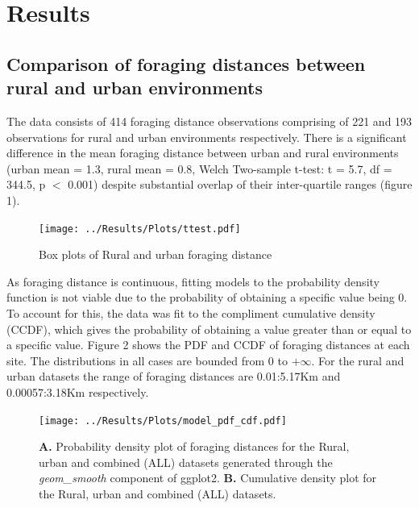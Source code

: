 \documentclass[11pt]{article}
\begin{document}
\section{Results}
\begin{linenumbers}

\subsection{Comparison of foraging distances between rural and urban environments}
The data consists of 414 foraging distance observations comprising of 221 and 193 observations for rural and urban environments respectively. There is a significant difference in the mean foraging distance between urban and rural environments (urban mean = 1.3, rural mean = 0.8, Welch Two-sample t-test: t = 5.7, df = 344.5, p $<$ 0.001) despite substantial overlap of their inter-quartile ranges (figure 1).\\ \par

\begin{figure}[H]
	\centering
	\texttt{[image: ../Results/Plots/ttest.pdf]}
	\caption{Box plots of Rural and urban foraging distance}
\end{figure}
	
As foraging distance is continuous, fitting models to the probability density function is not viable due to the probability of obtaining a specific value being 0. To account for this, the data was fit to the compliment cumulative density (CCDF), which gives the probability of obtaining a value greater than or equal to a specific value. Figure 2 shows the PDF and CCDF of foraging distances at each site. The distributions in all cases are bounded from 0 to $+\infty$. For the rural and urban datasets the range of foraging distances are 0.01:5.17Km and 0.00057:3.18Km respectively.\\\par

\begin{figure}[H]
	\centering
	\texttt{[image: ../Results/Plots/model\_pdf\_cdf.pdf]}
	\caption{\textbf{A.} Probability density plot of foraging distances for the Rural, urban and combined (ALL) datasets generated through the \textit{geom\_smooth} component of ggplot2. \textbf{B.} Cumulative density plot for the Rural, urban and combined (ALL) datasets.}
\end{figure}


\end{linenumbers}
\end{document}
